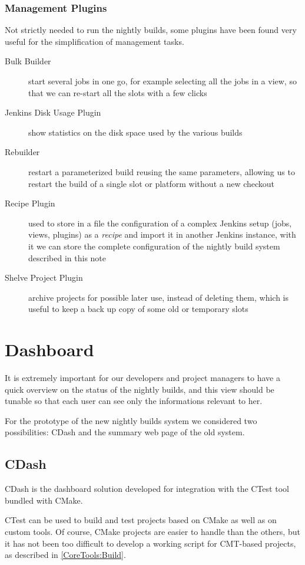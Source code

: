\documentclass{lhcbnote}
\begin{document}
\subsubsection{Management Plugins}
\label{Jenkins:Management}
Not strictly needed to run the nightly builds, some plugins have been found very
useful for the simplification of management tasks.
\begin{description}
  \item[Bulk Builder] start several jobs in one go, for example selecting all
the jobs in a view, so that we can re-start all the slots with a few clicks
  \item[Jenkins Disk Usage Plugin] show statistics on the disk space used by the
various builds
  \item[Rebuilder] restart a parameterized build reusing the same parameters,
allowing us to restart the build of a single slot or platform without a new
checkout
  \item[Recipe Plugin] used to store in a file the configuration of a complex
Jenkins setup (jobs, views, plugins) as a \emph{recipe} and import it in another
Jenkins instance, with it we can store the complete configuration of the nightly
build system described in this note
  \item[Shelve Project Plugin] archive projects for possible later use, instead
of deleting them, which is useful to keep a back up copy of some old or
temporary slots
\end{description}

\section{Dashboard}
\label{Dashboard}
It is extremely important for our developers and project managers to have a
quick overview on the status of the nightly builds, and this view should be
tunable so that each user can see only the informations relevant to her.

For the prototype of the new nightly builds system we considered two
possibilities: CDash and the summary web page of the old system.

\subsection{CDash}
\label{Dashboard:CDash}
CDash is the dashboard solution developed for integration with the CTest tool
bundled with CMake.

CTest can be used to build and test projects based on CMake as well as on custom
tools.  Of course, CMake projects are easier to handle than the others, but it
has not been too difficult to develop a working script for CMT-based projects,
as described in \ref{CoreTools:Build}.
\end{document}
